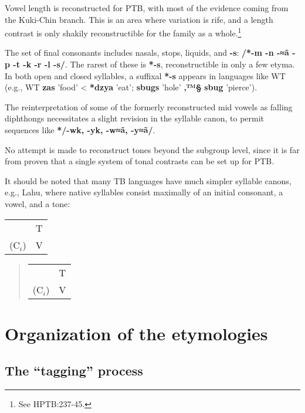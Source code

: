 Vowel length is reconstructed for PTB, with most of the evidence coming from the Kuki-Chin branch. This is an area where variation is rife, and a length contrast is only shakily reconstructible for the family as a whole.\footnote{See HPTB:237-45.}

The set of final consonants includes nasals, stops, liquids, and \textbf{-s}: \textbf{/*-m -n -≈ã -p -t -k -r -l -s/}. The rarest of these is \textbf{*-s}, reconstructible in only a few etyma. In both open and closed syllables, a suffixal \textbf{*-s} appears in languages like WT (e.g., WT \textbf{zas} 'food' < \textbf{*dzya} 'eat'; \textbf{sbugs} 'hole' \textbf{‚™§} \textbf{sbug} 'pierce').

The reinterpretation of some of the formerly reconstructed mid vowels as falling diphthongs necessitates a slight revision in the syllable canon, to permit sequences like \textbf{*/-wk, -yk, -w≈ã, -y≈ã/}.

No attempt is made to reconstruct tones beyond the subgroup level, since it is far from proven that a single system of tonal contrasts can be set up for PTB.

It should be noted that many TB languages have much simpler syllable canons, e.g., Lahu, where native syllables consist maximally of an initial consonant, a vowel, and a tone:

\begin{tabular}{c c}
 & T\\
(C$_i$) & V\\
\end{tabular}


\begin{quote}
\begin{tabular}{ll}
	&T\\
($\textrm{C}_i$)	&V\\
\end{tabular}
\end{quote}


\section{Organization of the etymologies}

\subsection{The “tagging” process}

